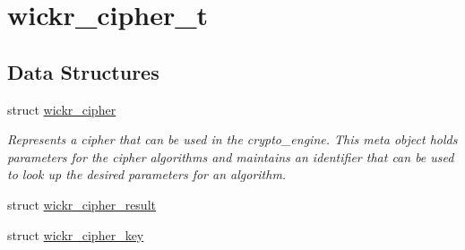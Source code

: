 \hypertarget{group__wickr__cipher}{}\section{wickr\+\_\+cipher\+\_\+t}
\label{group__wickr__cipher}
\subsection*{Data Structures}
\begin{DoxyCompactItemize}
\item 
struct \mbox{\hyperlink{structwickr__cipher}{wickr\+\_\+cipher}}
\begin{DoxyCompactList}\small\item\em Represents a cipher that can be used in the crypto\+\_\+engine. This meta object holds parameters for the cipher algorithms and maintains an identifier that can be used to look up the desired parameters for an algorithm. \end{DoxyCompactList}\item 
struct \mbox{\hyperlink{structwickr__cipher__result}{wickr\+\_\+cipher\+\_\+result}}
\item 
struct \mbox{\hyperlink{structwickr__cipher__key}{wickr\+\_\+cipher\+\_\+key}}
\end{DoxyCompactItemize}
